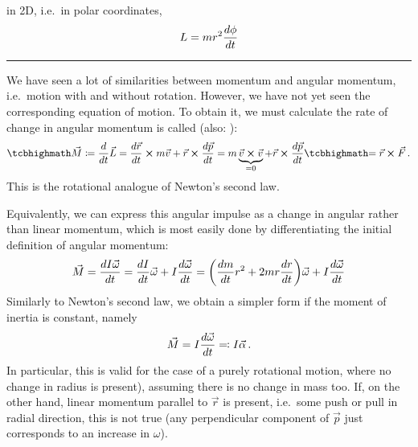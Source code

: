 \documentclass[../class_mech_main.tex]{subfiles}
\begin{document}
in 2D, i.e.~in polar coordinates,
\begin{equation}
	L = m r^2 \dv{\phi}{t}
\end{equation}


\hrule


We have seen a lot of similarities between momentum and angular momentum, i.e.~motion with and without rotation. However, we have not yet seen the corresponding equation of motion. To obtain it, we must calculate the rate of change in angular momentum is called  (also: ):
\begin{equation}
    \eqbox{\vec{M}} \coloneqq \dv{t} \vec{L} = \dv{\vec{r}}{t} \cross m \vec{v} + \vec{r} \cross \dv{\vec{p}}{t} = m \underbrace{\vec{v} \cross \vec{v}}_{= 0} + \vec{r} \cross \dv{\vec{p}}{t} \eqbox{= \vec{r} \cross \vec{F}} \, .
\end{equation}
This is the rotational analogue of Newton's second law.


Equivalently, we can express this angular impulse as a change in angular rather than linear momentum, which is most easily done by differentiating the initial definition of angular momentum:
\begin{align}
	\vec{M} = \dv{I \vec{\omega}}{t} = \dv{I}{t} \vec{\omega} + I \dv{\vec{\omega}}{t}
	= \qty(\dv{m}{t} r^2 + 2 m r \dv{r}{t}) \vec{\omega} + I \dv{\vec{\omega}}{t}
\end{align}
Similarly to Newton's second law, we obtain a simpler form if the moment of inertia is constant, namely
\begin{equation}
	\vec{M} = I \dv{\vec{\omega}}{t} \eqqcolon I \vec{\alpha} \, .
\end{equation}
In particular, this is valid for the case of a purely rotational motion, where no change in radius is present), assuming there is no change in mass too. If, on the other hand, linear momentum parallel to $\vec{r}$ is present, i.e.~some push or pull in radial direction, this is not true (any perpendicular component of $\vec{p}$ just corresponds to an increase in $\omega$).
\end{document}
